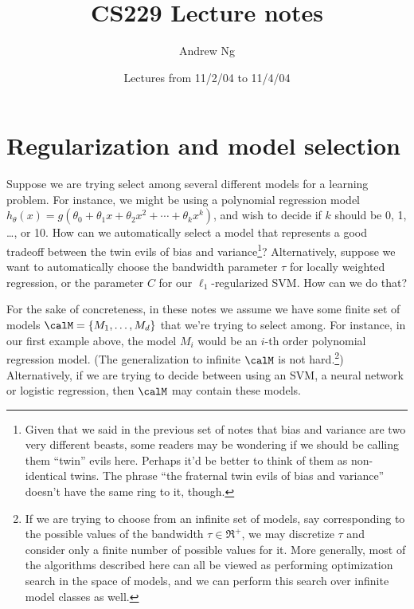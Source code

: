 \documentclass{article}
\begin{document}
\title{CS229 Lecture notes}
\author{Andrew Ng}
\date{Lectures from 11/2/04 to 11/4/04}
\maketitle


\noindent


\setcounter{part}{5}
\part{Regularization and model selection}


Suppose we are trying select among several different models
for a learning problem.  For instance, we might be using a polynomial
regression model 
$h_\theta(x) = g(\theta_0 + \theta_1 x + \theta_2 x^2 + \cdots + \theta_k x^k)$,
and wish to decide if $k$ should be 0, 1, \dots, or 10.  
How can we automatically select a
model that represents a good tradeoff 
between the twin evils of bias and variance\footnote{Given that we
said in the previous set of notes that bias and variance are two very different 
beasts, some readers may be wondering if we should be calling them ``twin'' 
evils here.  Perhaps it'd be better to think of them as non-identical twins. 
The phrase ``the fraternal twin evils of bias and variance'' doesn't have 
the same ring to it, though.}?
Alternatively, suppose we want to 
automatically choose the bandwidth parameter $\tau$ for locally weighted regression, 
or the parameter $C$ for our $\ell_1$-regularized SVM.  How can we 
do that?

For the sake of concreteness, in these notes we assume we
have some finite set of models $\calM = \{M_1, \ldots, M_d\}$
that we're trying to select among.  For instance, in our first
example above, the model $M_i$ would be an 
$i$-th order polynomial regression model.
(The generalization to infinite $\calM$ is not 
hard.\footnote{If we are trying to choose from an infinite set of models, say 
corresponding to the possible values of the bandwidth $\tau \in \Re^+$, we 
may discretize $\tau$ and consider only a finite number 
of possible values for it.  More generally, most of the algorithms described here 
can all be viewed as performing optimization search in the space
of models, and we can perform this search over infinite model
classes as well.}) 
Alternatively, if we are trying to decide between using an SVM,
a neural network or logistic regression, then $\calM$ may 
contain these models. 
\end{document}
